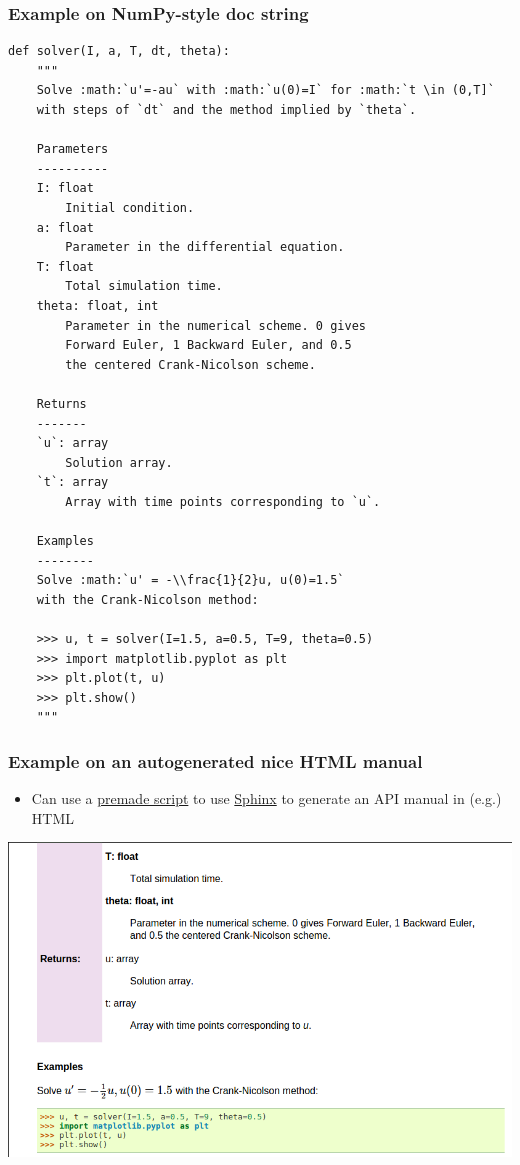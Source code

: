 \documentclass{beamer}
\begin{document}
\begin{frame}
\frametitle{Example on NumPy-style doc string}

\begin{verbatim}
def solver(I, a, T, dt, theta):
    """
    Solve :math:`u'=-au` with :math:`u(0)=I` for :math:`t \in (0,T]`
    with steps of `dt` and the method implied by `theta`.

    Parameters
    ----------
    I: float
        Initial condition.
    a: float
        Parameter in the differential equation.
    T: float
        Total simulation time.
    theta: float, int
        Parameter in the numerical scheme. 0 gives
        Forward Euler, 1 Backward Euler, and 0.5
        the centered Crank-Nicolson scheme.

    Returns
    -------
    `u`: array
        Solution array.
    `t`: array
        Array with time points corresponding to `u`.

    Examples
    --------
    Solve :math:`u' = -\\frac{1}{2}u, u(0)=1.5`
    with the Crank-Nicolson method:

    >>> u, t = solver(I=1.5, a=0.5, T=9, theta=0.5)
    >>> import matplotlib.pyplot as plt
    >>> plt.plot(t, u)
    >>> plt.show()
    """
\end{verbatim}
\end{frame}

\begin{frame}
\frametitle{Example on an autogenerated nice HTML manual}

\begin{itemize}
 \item Can use a \href{{http://tinyurl.com/ofkw6kc/softeng/make_sphinx_api.py}}{premade script} to use \href{{http://sphinx-doc.org/}}{Sphinx} to generate an API manual in (e.g.) HTML
\end{itemize}

\noindent
\centerline{\includegraphics[width=0.8\linewidth]{fig-softeng/selfdoc_numpy.png}}
\end{frame}
\end{document}
